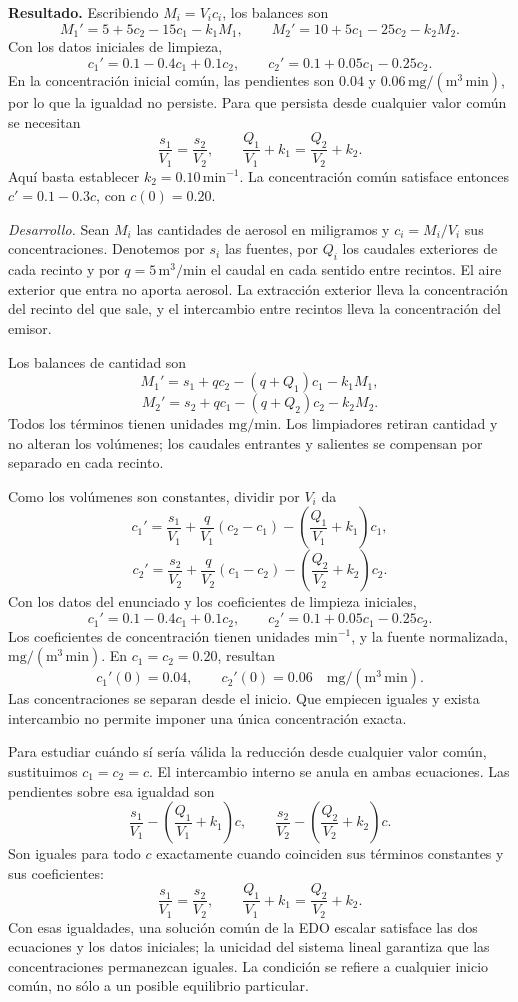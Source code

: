 \noindent\textbf{Resultado.} Escribiendo \(M_i=V_ic_i\), los balances son
\[
M_1'=5+5c_2-15c_1-k_1M_1,\qquad
M_2'=10+5c_1-25c_2-k_2M_2.
\]
Con los datos iniciales de limpieza,
\[
c_1'=0.1-0.4c_1+0.1c_2,\qquad
c_2'=0.1+0.05c_1-0.25c_2.
\]
En la concentración inicial común, las pendientes son \(0.04\) y \(0.06\,\mathrm{mg/(m^3\,min)}\), por lo que la igualdad no persiste. Para que persista desde cualquier valor común se necesitan
\[
\frac{s_1}{V_1}=\frac{s_2}{V_2},\qquad
\frac{Q_1}{V_1}+k_1=\frac{Q_2}{V_2}+k_2.
\]
Aquí basta establecer \(k_2=0.10\,\mathrm{min}^{-1}\). La concentración común satisface entonces \(c'=0.1-0.3c\), con \(c(0)=0.20\).

\noindent\textit{Desarrollo.} Sean \(M_i\) las cantidades de aerosol en miligramos y \(c_i=M_i/V_i\) sus concentraciones. Denotemos por \(s_i\) las fuentes, por \(Q_i\) los caudales exteriores de cada recinto y por \(q=5\,\mathrm{m^3/min}\) el caudal en cada sentido entre recintos. El aire exterior que entra no aporta aerosol. La extracción exterior lleva la concentración del recinto del que sale, y el intercambio entre recintos lleva la concentración del emisor.

Los balances de cantidad son
\[
M_1'=s_1+q c_2-(q+Q_1)c_1-k_1M_1,
\]
\[
M_2'=s_2+q c_1-(q+Q_2)c_2-k_2M_2.
\]
Todos los términos tienen unidades \(\mathrm{mg/min}\). Los limpiadores retiran cantidad y no alteran los volúmenes; los caudales entrantes y salientes se compensan por separado en cada recinto.

Como los volúmenes son constantes, dividir por \(V_i\) da
\[
c_1'=\frac{s_1}{V_1}+\frac q{V_1}(c_2-c_1)
-\left(\frac{Q_1}{V_1}+k_1\right)c_1,
\]
\[
c_2'=\frac{s_2}{V_2}+\frac q{V_2}(c_1-c_2)
-\left(\frac{Q_2}{V_2}+k_2\right)c_2.
\]
Con los datos del enunciado y los coeficientes de limpieza iniciales,
\[
c_1'=0.1-0.4c_1+0.1c_2,\qquad
c_2'=0.1+0.05c_1-0.25c_2.
\]
Los coeficientes de concentración tienen unidades \(\mathrm{min}^{-1}\), y la fuente normalizada, \(\mathrm{mg/(m^3\,min)}\). En \(c_1=c_2=0.20\), resultan
\[
c_1'(0)=0.04,\qquad c_2'(0)=0.06
\quad\mathrm{mg/(m^3\,min)}.
\]
Las concentraciones se separan desde el inicio. Que empiecen iguales y exista intercambio no permite imponer una única concentración exacta.

Para estudiar cuándo sí sería válida la reducción desde cualquier valor común, sustituimos \(c_1=c_2=c\). El intercambio interno se anula en ambas ecuaciones. Las pendientes sobre esa igualdad son
\[
\frac{s_1}{V_1}-\left(\frac{Q_1}{V_1}+k_1\right)c,
\qquad
\frac{s_2}{V_2}-\left(\frac{Q_2}{V_2}+k_2\right)c.
\]
Son iguales para todo \(c\) exactamente cuando coinciden sus términos constantes y sus coeficientes:
\[
\frac{s_1}{V_1}=\frac{s_2}{V_2},\qquad
\frac{Q_1}{V_1}+k_1=\frac{Q_2}{V_2}+k_2.
\]
Con esas igualdades, una solución común de la EDO escalar satisface las dos ecuaciones y los datos iniciales; la unicidad del sistema lineal garantiza que las concentraciones permanezcan iguales. La condición se refiere a cualquier inicio común, no sólo a un posible equilibrio particular.

